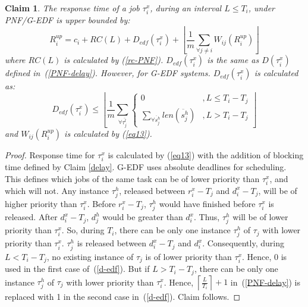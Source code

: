 \documentclass[12pt,english]{report}
\newtheorem{clm}{Claim}
\newtheorem{proof}{Proof}
\begin{document}
\begin{clm}\label{response time ecm PNF}
The response time of a job $\tau_{i}^{x}$, during an interval $L\le T_{i}$, under PNF/G-EDF is upper bounded by:
\begin{equation}
R_{i}^{up}=c_{i}+RC(L)+D_{edf}(\tau_{i}^{x})+\left\lfloor \frac{1}{m}\sum_{\forall j\ne i}W_{ij}(R_{i}^{up})\right\rfloor 
\end{equation}
where $RC(L)$ is calculated by (\ref{rc-PNF}). $D_{edf}(\tau_{i}^{x})$
is the same as $D(\tau_{i}^{x})$ defined in~(\ref{PNF-delay}). However, for G-EDF systems. $D_{edf}(\tau_i^x)$ is calculated as:
\begin{equation}
D_{edf}(\tau_{i}^{x})\le\left\lfloor \frac{1}{m}\sum_{\forall\bar{\tau_{j}^{l}}}\begin{cases}
0 & ,L\le T_{i}-T_{j}\\
\sum_{\forall\ddot{s_{j}^{h}}}len\left(\ddot{s_{j}^{h}}\right) & ,L>T_{i}-T_{j}
\end{cases}\right\rfloor \label{d-edf}
\end{equation}
and $W_{ij}(R_{i}^{up})$ is calculated by (\ref{eq13}).
\end{clm}
\begin{proof}\normalfont
Response time for $\tau_{i}^{x}$ is calculated by (\ref{eq13}) with the addition of blocking time defined by Claim \ref{delay}. G-EDF uses absolute deadlines for scheduling. This defines which jobs of the same task can be of lower priority than $\tau_{i}^{x}$, and which will not. Any instance $\tau_j^h$, released between $r_i^x - T_j$ and $d_i^x - T_j$, will be of higher priority than $\tau_i^x$. Before $r_i^x-T_j$, $\tau_j^h$ would have finished before $\tau_i^x$ is released. After $d_i^x-T_j$, $d_j^h$ would be greater than $d_i^x$. Thus, $\tau_j^h$ will be of lower priority than $\tau_i^x$. So, during $T_i$, there can be only one instance $\tau_j^h$ of $\tau_j$ with lower priority than $\tau_i^x$. $\tau_j^h$ is released between $d_i^x-T_j$ and $d_i^x$. Consequently, during $L<T_i-T_j$, no existing instance of $\tau_j$ is of lower  priority than $\tau_i^x$. Hence, 0 is used in the first case of~(\ref{d-edf}). But if $L>T_i-T_j$, there can be only one instance $\tau_j^h$ of $\tau_j$ with lower priority than $\tau_i^x$. Hence, $\left\lceil\frac{L}{T_i}\right\rceil+1$ in~(\ref{PNF-delay}) is replaced with 1 in the second case in~(\ref{d-edf}). Claim follows.
\end{proof}
\end{document}
